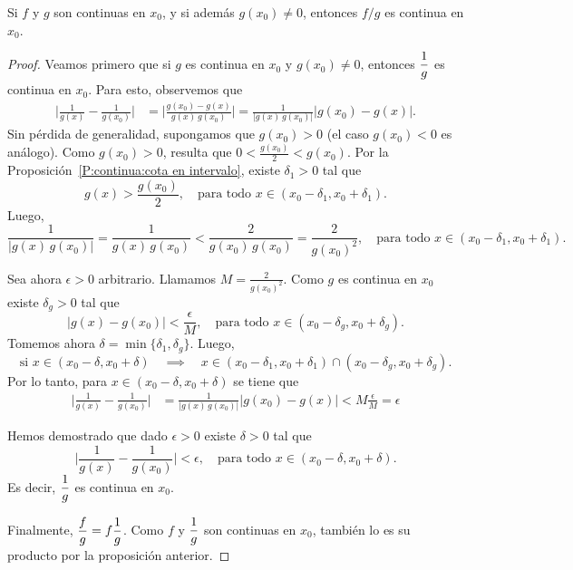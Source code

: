\begin{proposition}
    Si $f$ y $g$ son continuas en $x_0$, 
    y si además $g(x_0)\neq 0$, entonces $f/g$ es continua en $x_0$.
\end{proposition}

\begin{proof}
    Veamos primero que si $g$ es continua en $x_0$ y $g(x_0)\neq 0$, entonces $\displaystyle\frac1g$ es continua en $x_0$.
    Para esto, observemos que
    \begin{align*}
        \Big| \frac1{g(x)}-\frac1{g(x_0)} \Big| 
        &= 
        \Big| \frac{g(x_0)-g(x)}{g(x)\,g(x_0)} \Big| 
        = 
         \frac{1}{|g(x)\,g(x_0)|}
        \big| g(x_0)-g(x) | .
    \end{align*}
    Sin pérdida de generalidad, supongamos que $g(x_0)>0$ (el caso $g(x_0)<0$ es análogo).
    Como $g(x_0)>0$, resulta que $0<\frac{g(x_0)}{2}<g(x_0)$. 
    Por la Proposición~\ref{P:continua:cota en intervalo}, existe $\delta_1>0$ tal que 
\[
g(x)>\frac{g(x_0)}2,  \quad\text{para todo $x\in(x_0-\delta_1,x_0+\delta_1)$}.
\] 
Luego, 
\[
\frac{1}{|g(x)\,g(x_0)|} = \frac{1}{g(x)\,g(x_0)}
< \frac{2}{g(x_0)\,g(x_0)}
= \frac{2}{g(x_0)^2},  \quad\text{para todo $x\in(x_0-\delta_1,x_0+\delta_1)$}.
\] 

Sea ahora $\epsilon>0$ arbitrario.
Llamamos $M=\frac{2}{g(x_0)^2}$.
Como $g$ es continua en $x_0$ existe $\delta_g>0$ tal que 
\[
|g(x)-g(x_0)|<\frac\epsilon{M}, \quad\text{para todo $x\in(x_0-\delta_g,x_0+\delta_g)$}.
\]
Tomemos ahora $\delta=\min\{\delta_1,\delta_g\}$. Luego,
\[
\text{si $x\in (x_0-\delta,x_0+\delta)$}
\quad\implies\quad
x\in(x_0-\delta_1,x_0+\delta_1)\cap(x_0-\delta_g,x_0+\delta_g).
\]
Por lo tanto, para $x\in (x_0-\delta,x_0+\delta)$ se tiene que
    \begin{align*}
        \Big| \frac1{g(x)}-\frac1{g(x_0)} \Big| 
        &= 
         \frac{1}{|g(x)\,g(x_0)|}
        \big| g(x_0)-g(x) | 
        < M \frac{\epsilon}M = \epsilon
    \end{align*}

Hemos demostrado que dado $\epsilon>0$ existe $\delta>0$ tal que
\[
        \Big| \frac1{g(x)}-\frac1{g(x_0)} \Big| <\epsilon,
        \quad\text{para todo $x\in(x_0-\delta,x_0+\delta)$}.
\]
Es decir, $\displaystyle\frac1g$ es continua en $x_0$.

Finalmente, $\displaystyle\frac fg = f \frac1g$. Como $f$ y $\displaystyle\frac1g$ son continuas en $x_0$, también lo es su producto por la proposición anterior.
\end{proof}

